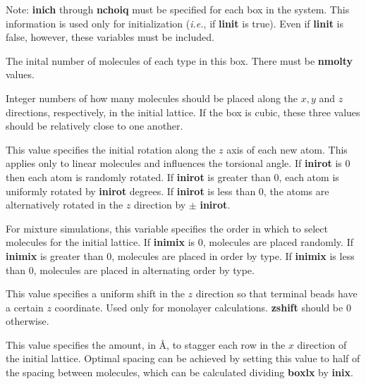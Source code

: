\documentclass[12pt,letterpaper]{article}
\begin{document}
\noindent Note: \textbf{inich} through \textbf{nchoiq} must be specified for each box in the system.
This information is used only for initialization ({\textit{i.e.}}, if {\textbf{linit}} is true).  
Even if {\textbf{linit}} is false, however, these variables must be included.

 The inital number of molecules of each type in this box.  
There must be {\textbf{nmolty}} values.

 Integer numbers of how many molecules
should be placed along the $x, y$ and $z$ directions, respectively, in the initial
lattice.  If the box is cubic, these three values should be relatively close to one another.

 This value specifies the initial rotation along the $z$ axis of each new atom.
This applies only to linear molecules and influences the torsional angle.
If {\textbf{inirot}} is 0 then each atom is randomly rotated.  If {\textbf{inirot}} is greater than 0, 
each atom is uniformly rotated by {\textbf{inirot}} degrees.  
If {\textbf{inirot}} is less than 0, the atoms are alternatively rotated in the $z$ direction by {$\mathbf {\pm}$ \textbf{inirot}}.  

 For mixture simulations, this variable specifies the order
in which to select molecules for the initial lattice. 
If {\textbf{inimix}} is 0, molecules are placed randomly.
If {\textbf{inimix}} is greater than 0, molecules are placed in order by type.
If {\textbf{inimix}} is less than 0, molecules are placed in alternating order by type.

 This value specifies a uniform shift in the $z$ direction so
that terminal beads have a certain $z$ coordinate.  Used only for monolayer calculations.
{\textbf{zshift}} should be 0 otherwise.

 This value specifies the amount, in {\AA}, to stagger each row in the $x$
direction of the initial lattice.  
Optimal spacing can be achieved by setting this value to half of the spacing between molecules,
which can be calculated dividing {\textbf {boxlx}} by {\textbf {inix}}.

\end{document}
